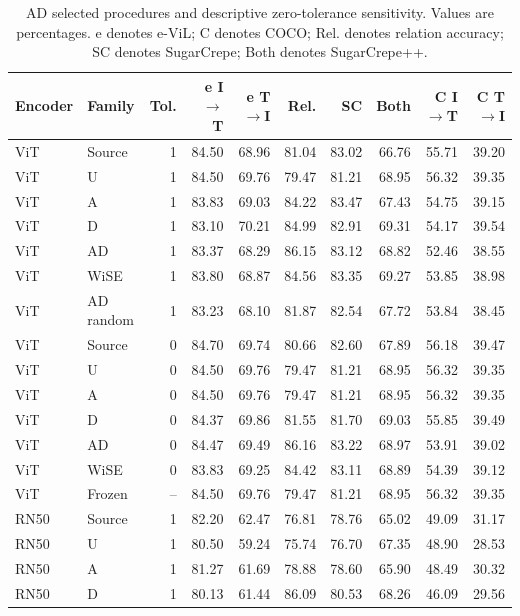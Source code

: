\begin{table}[t]
\centering
\scriptsize
\setlength{\tabcolsep}{3pt}
\begin{tabular}{llrrrrrrrr}
\toprule
Encoder & Family & Tol. & e I$\to$T & e T$\to$I & Rel. & SC & Both & C I$\to$T & C T$\to$I\\
\midrule
ViT & Source & 1 & 84.50 & 68.96 & 81.04 & 83.02 & 66.76 & 55.71 & 39.20\\
ViT & U & 1 & 84.50 & 69.76 & 79.47 & 81.21 & 68.95 & 56.32 & 39.35\\
ViT & A & 1 & 83.83 & 69.03 & 84.22 & 83.47 & 67.43 & 54.75 & 39.15\\
ViT & D & 1 & 83.10 & 70.21 & 84.99 & 82.91 & 69.31 & 54.17 & 39.54\\
ViT & AD & 1 & 83.37 & 68.29 & 86.15 & 83.12 & 68.82 & 52.46 & 38.55\\
ViT & WiSE & 1 & 83.80 & 68.87 & 84.56 & 83.35 & 69.27 & 53.85 & 38.98\\
ViT & AD random & 1 & 83.23 & 68.10 & 81.87 & 82.54 & 67.72 & 53.84 & 38.45\\
ViT & Source & 0 & 84.70 & 69.74 & 80.66 & 82.60 & 67.89 & 56.18 & 39.47\\
ViT & U & 0 & 84.50 & 69.76 & 79.47 & 81.21 & 68.95 & 56.32 & 39.35\\
ViT & A & 0 & 84.50 & 69.76 & 79.47 & 81.21 & 68.95 & 56.32 & 39.35\\
ViT & D & 0 & 84.37 & 69.86 & 81.55 & 81.70 & 69.03 & 55.85 & 39.49\\
ViT & AD & 0 & 84.47 & 69.49 & 86.16 & 83.22 & 68.97 & 53.91 & 39.02\\
ViT & WiSE & 0 & 83.83 & 69.25 & 84.42 & 83.11 & 68.89 & 54.39 & 39.12\\
ViT & Frozen & -- & 84.50 & 69.76 & 79.47 & 81.21 & 68.95 & 56.32 & 39.35\\
RN50 & Source & 1 & 82.20 & 62.47 & 76.81 & 78.76 & 65.02 & 49.09 & 31.17\\
RN50 & U & 1 & 80.50 & 59.24 & 75.74 & 76.70 & 67.35 & 48.90 & 28.53\\
RN50 & A & 1 & 81.27 & 61.69 & 78.88 & 78.60 & 65.90 & 48.49 & 30.32\\
RN50 & D & 1 & 80.13 & 61.44 & 86.09 & 80.53 & 68.26 & 46.09 & 29.56\\
\bottomrule
\end{tabular}
\caption{AD selected procedures and descriptive zero-tolerance sensitivity. Values are percentages. e denotes e-ViL; C denotes COCO; Rel. denotes relation accuracy; SC denotes SugarCrepe; Both denotes SugarCrepe++.}\label{tab:admetrics0}
\end{table}


